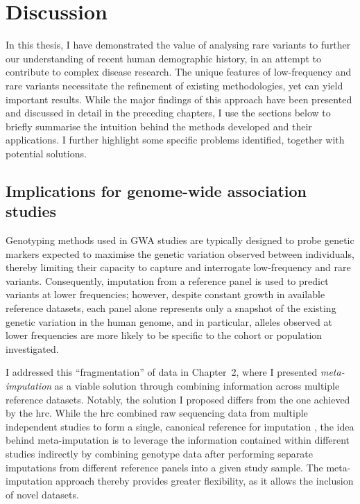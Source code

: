 
\glsresetall




{
\singlespacing
\chapter{Discussion}
\label{ch:discussion}
\minitoc
}


In this thesis, I have demonstrated the value of analysing rare variants to further our understanding of recent human demographic history, in an attempt to contribute to complex disease research.
The unique features of low-frequency and rare variants necessitate the refinement of existing methodologies, yet can yield important results.
While the major findings of this approach have been presented and discussed in detail in the preceding chapters, I use the sections below to briefly summarise the intuition behind the methods developed and their applications.
I further highlight some specific problems identified, together with potential solutions.



%
\section{Implications for genome-wide association studies}
%

Genotyping methods used in GWA studies are typically designed to probe genetic markers expected to maximise the genetic variation observed between individuals, thereby limiting their capacity to capture and interrogate low-frequency and rare variants.
Consequently, imputation from a reference panel is used to predict variants at lower frequencies; however, despite constant growth in available reference datasets, each panel alone represents only a snapshot of the existing genetic variation in the human genome, and in particular, alleles observed at lower frequencies are more likely to be specific to the cohort or population investigated.

I addressed this ``fragmentation'' of data in Chapter~2, where I presented \emph{meta-imputation} as a viable solution through combining information across multiple reference datasets.
Notably, the solution I proposed differs from the one achieved by the \gls{hrc}.
While the \gls{hrc} combined raw sequencing data from multiple independent studies to form a single, canonical reference for imputation \citep{McCarthy:2016gs}, the idea behind meta-imputation is to leverage the information contained within different studies indirectly by combining genotype data after performing separate imputations from different reference panels into a given study sample.
The meta-imputation approach thereby provides greater flexibility, as it allows the inclusion of novel datasets.


